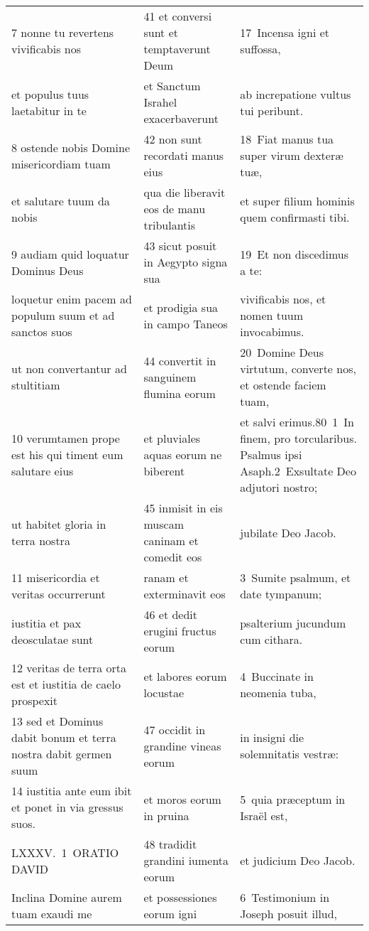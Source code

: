 \documentclass{article}
\begin{document}
\begin{longtable}{@{}p{}p{}p{}@{}}
7 nonne tu revertens vivificabis nos	&	41 et conversi sunt et temptaverunt Deum	&	17 Incensa igni et suffossa,	\\
et populus tuus laetabitur in te	&	et Sanctum Israhel exacerbaverunt	&	ab increpatione vultus tui peribunt.	\\
8 ostende nobis Domine misericordiam tuam	&	42 non sunt recordati manus eius	&	18 Fiat manus tua super virum dexteræ tuæ,	\\
et salutare tuum da nobis	&	qua die liberavit eos de manu tribulantis	&	et super filium hominis quem confirmasti tibi.	\\
9 audiam quid loquatur Dominus Deus	&	43 sicut posuit in Aegypto signa sua	&	19 Et non discedimus a te:	\\
loquetur enim pacem ad populum suum et ad sanctos suos	&	et prodigia sua in campo Taneos	&	vivificabis nos, et nomen tuum invocabimus.	\\
ut non convertantur ad stultitiam	&	44 convertit in sanguinem flumina eorum	&	20 Domine Deus virtutum, converte nos, et ostende faciem tuam,	\\
10 verumtamen prope est his qui timent eum salutare eius	&	et pluviales aquas eorum ne biberent	&	et salvi erimus.80 1 In finem, pro torcularibus. Psalmus ipsi Asaph.2 Exsultate Deo adjutori nostro;	\\
ut habitet gloria in terra nostra	&	45 inmisit in eis muscam caninam et comedit eos	&	jubilate Deo Jacob.	\\
11 misericordia et veritas occurrerunt	&	ranam et exterminavit eos	&	3 Sumite psalmum, et date tympanum;	\\
iustitia et pax deosculatae sunt	&	46 et dedit erugini fructus eorum	&	psalterium jucundum cum cithara.	\\
12 veritas de terra orta est et iustitia de caelo prospexit	&	et labores eorum locustae	&	4 Buccinate in neomenia tuba,	\\
13 sed et Dominus dabit bonum et terra nostra dabit germen suum	&	47 occidit in grandine vineas eorum	&	in insigni die solemnitatis vestræ:	\\
14 iustitia ante eum ibit et ponet in via gressus suos.	&	et moros eorum in pruina	&	5 quia præceptum in Israël est,	\\
LXXXV. 1 ORATIO DAVID	&	48 tradidit grandini iumenta eorum	&	et judicium Deo Jacob.	\\
Inclina Domine aurem tuam exaudi me	&	et possessiones eorum igni	&	6 Testimonium in Joseph posuit illud,	\\

\end{longtable}
\end{document}
